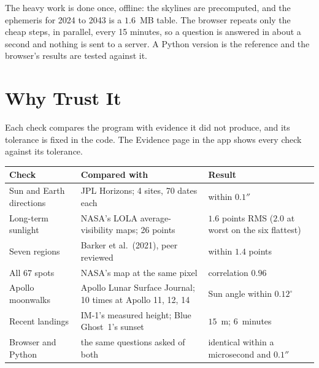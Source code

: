The heavy work is done once, offline: the skylines are precomputed, and the ephemeris for 2024 to 2043 is a $1.6$~MB table. The browser repeats only the cheap steps, in parallel, every 15 minutes, so a question is answered in about a second and nothing is sent to a server. A Python version is the reference and the browser's results are tested against it.

\section{Why Trust It}\label{sec:validation}
Each check compares the program with evidence it did not produce, and its tolerance is fixed in the code. The Evidence page in the app shows every check against its tolerance.

\begin{lztable}
\begin{tabularx}{\textwidth}{@{}P{3.2cm}L>{\raggedright\arraybackslash}p{4.6cm}@{}}
\toprule
\textbf{Check} & \textbf{Compared with} & \textbf{Result} \\
\midrule
Sun and Earth directions & JPL Horizons; 4 sites, 70 dates each & within $0.1''$ \\
Long-term sunlight & NASA's LOLA average-visibility maps; 26 points & $1.6$ points RMS ($2.0$ at worst on the six flattest) \\
Seven regions & Barker et al.\ (2021), peer reviewed & within $1.4$ points \\
All 67 spots & NASA's map at the same pixel & correlation $0.96$ \\
Apollo moonwalks & Apollo Lunar Surface Journal; 10 times at Apollo 11, 12, 14 & Sun angle within $0.12^\circ$ \\
Recent landings & IM-1's measured height; Blue Ghost~1's sunset & $15$~m; $6$~minutes \\
Browser and Python & the same questions asked of both & identical within a microsecond and $0.1''$ \\
\bottomrule
\end{tabularx}
\end{lztable}

